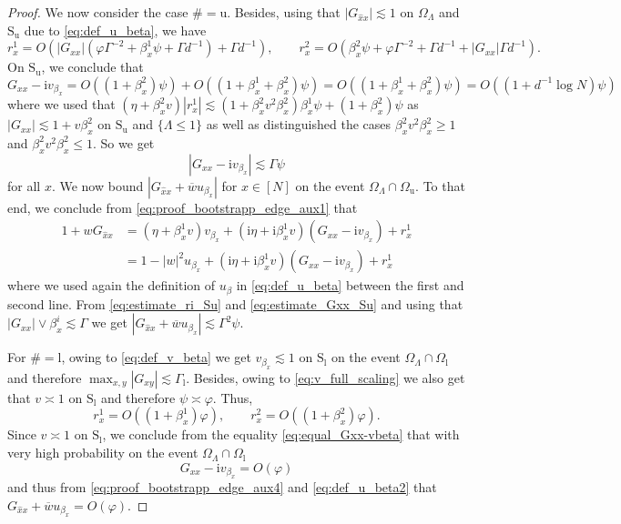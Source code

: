 \documentclass[10pt,a4paper]{amsart}
\newcommand{\ii}{\mathrm{i}}
\newcommand{\abs}[1]{\left| #1 \right|}
\numberwithin{equation}{section}
\newcommand*\barr[1]{\overline{#1}}
\newcommand*\ubarr[1]{{\widehat{#1}}}
\begin{document}
\begin{proof}
		We now consider the case $\# = \mathrm{u}$. 
		Besides, using that $\abs{G_{\ubarr{x}x}} \lesssim 1$ on $\Omega_{\Lambda}$ and $\mathrm{S}_\mathrm{u}$ due to \eqref{eq:def_u_beta}, 
		we have 
			\begin{equation}\label{eq:estimate_ri_Su}
			r_x^1 = O(\abs{G_{xx}} (\varphi \Gamma^{-2} +  \beta^1_x \psi  + \Gamma d^{-1}) + \Gamma d^{-1} ) 
		, \qquad r_x^2= O(\beta^2_x \psi + \varphi \Gamma^{-2} + \Gamma d^{-1} + \abs{G_{xx}} \Gamma d^{-1} ).
		\end{equation}
	 On $\mathrm{S}_\mathrm{u}$, we conclude that
		\[ 
		G_{xx} - \ii v_{\beta_x} = O ( (1 + \beta_x^2 )\psi) + O( (1 + \beta_x^1 + \beta_x^2 ) \psi) = O( ( 1  + \beta_x^1 + \beta_x^2 ) \psi) = O( (1 + d^{-1} \log N)\psi ) 
		\]
		where we used that $(\eta + \beta_x^2 v) \abs{r_x^1} \lesssim (1 + \beta_x^2 v^2 \beta_x^2) \beta_x^1 \psi + (1 + \beta_x^2) \psi $ as $\abs{G_{xx}} 
		\lesssim 1 + v\beta_x^2$ on $\mathrm{S}_\mathrm{u}$ and $\{ \Lambda \leq 1\}$ as well as distinguished the cases $\beta_x^2 v^2 \beta_x^2 \geq 1$ and $\beta_x^2 v^2 \beta_x^2 \leq 1$. 
		So we get 
		\begin{equation}\label{eq:estimate_Gxx_Su}
\abs{G_{xx} - \ii v_{\beta_x}} \lesssim \Gamma \psi 		    
		\end{equation}
		for all $x$. We now bound $\abs{G_{ \ubarr{x}x} + \barr{w} u_{\beta_{x}}}$ for $x \in [N]$ on the event $\Omega_{\Lambda} \cap \Omega_{\mathrm u} $. To that end, we conclude from \eqref{eq:proof_bootstrapp_edge_aux1} that
		\begin{align*}
			1 + wG_{\ubarr{x}x} &= ( \eta + \beta_{x}^1 v) v_{\beta_x} + (\ii \eta + \ii \beta_{x}^1 v ) (G_{xx} - \ii v_{\beta_x}) + r_{x}^1\\
			&= 1 - \abs{w}^2 u_{\beta_x} + (\ii \eta + \ii \beta_{x}^1 v) (G_{xx} - \ii v_{\beta_x}) + r_{x}^1
		\end{align*}
		where we used again the definition of $u_{\beta}$ in \eqref{eq:def_u_beta} between the first and second line. From \eqref{eq:estimate_ri_Su} and \eqref{eq:estimate_Gxx_Su} and using that $|G_{xx}|\vee \beta^{i}_x \lesssim \Gamma$ we get 
		$\abs{G_{\ubarr{x}x} + \barr{w} u_{\beta_x}}\lesssim \Gamma^2 \psi$. 
		
For $\# = \mathrm{l}$, owing to \eqref{eq:def_v_beta} we get $v_{\beta_x} \lesssim 1$ on $\mathrm{S}_\mathrm{l}$ on the event $\Omega_{\Lambda} \cap \Omega_{\mathrm{l}}$ and therefore $\max_{x,y} \abs{G_{xy}} \lesssim \Gamma_{\mathrm{l}}$. Besides, owing to \cref{eq:v_full_scaling} we also get that $v \asymp 1$ on  $\mathrm{S}_\mathrm{l}$ and therefore $\psi \asymp \varphi $. Thus, 
		\[ r_x^1 = O( (1 + \beta_x^1)\varphi), \qquad r_x^2 = O( (1 + \beta_x^2) \varphi). \] 
		Since $v\asymp 1$ on $\mathrm{S}_\mathrm{l}$,  we conclude from the equality \eqref{eq:equal_Gxx-vbeta} that with very high probability on the event $\Omega_{\Lambda} \cap \Omega_{\mathrm{l}}$
		\[ G_{xx} - \ii v_{\beta_x} = O(\varphi) \] 
		and thus from \cref{eq:proof_bootstrapp_edge_aux4} and \cref{eq:def_u_beta2} that $G_{\ubarr{x}x} + \overline{w} u_{\beta_x} = O(\varphi)$. 
		

\end{proof}
\end{document}
